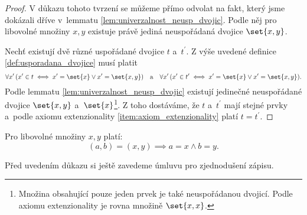 \begin{proof}
    V důkazu tohoto tvrzení se můžeme přímo odvolat na fakt, který jsme dokázali dříve v~lemmatu \ref{lem:univerzalnost_neusp_dvojic}. Podle něj pro libovolné množiny $x,y$ existuje právě jediná neuspořádaná dvojice $\set{x,y}$.\par
    Nechť existují dvě různé uspořádané dvojice $t$ a~$t^\prime$. Z výše uvedené definice \ref{def:usporadana_dvojice} musí platit
    \begin{equation*}
        \forall x^\prime\,(x^\prime\in t \iff x^\prime=\set{x} \lor x^\prime=\set{x,y})\quad\text{a}\quad \forall x^\prime\,(x^\prime\in t^\prime \iff x^\prime=\set{x} \lor x^\prime=\set{x,y}).
    \end{equation*}
    Podle lemmatu \ref{lem:univerzalnost_neusp_dvojic} existují jedinečné neuspořádané dvojice $\set{x,y}$ a~$\set{x}$\footnote{Množina obsahující pouze jeden prvek je také neuspořádanou dvojicí. Podle axiomu extenzionality je rovna množině $\set{x,x}$.}. Z toho dostáváme, že $t$ a~$t^\prime$ mají stejné prvky a~podle axiomu extenzionality \ref{item:axiom_extenzionality} platí $t=t^\prime$.
\end{proof}
\begin{lemma}\label{lem:vlastnost_usp_dvojic}
    Pro libovolné množiny $x,y$ platí:
    \begin{equation*}
        (a,b)=(x,y) \implies a=x \land b=y.
    \end{equation*}
\end{lemma}
Před uvedením důkazu si ještě zavedeme úmluvu pro zjednodušení zápisu.
